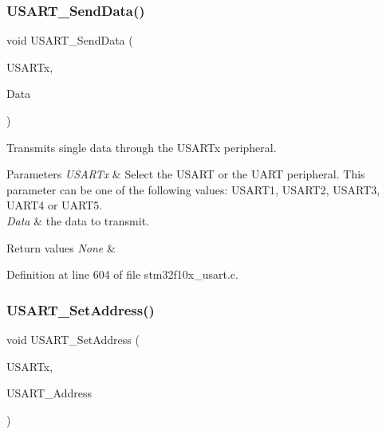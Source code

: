 \subsubsection{\texorpdfstring{U\+S\+A\+R\+T\+\_\+\+Send\+Data()}{USART\_SendData()}}
{\footnotesize\ttfamily void U\+S\+A\+R\+T\+\_\+\+Send\+Data (\begin{DoxyParamCaption}\item[{\hyperlink{struct_u_s_a_r_t___type_def}{U\+S\+A\+R\+T\+\_\+\+Type\+Def} $\ast$}]{U\+S\+A\+R\+Tx,  }\item[{uint16\+\_\+t}]{Data }\end{DoxyParamCaption})}



Transmits single data through the U\+S\+A\+R\+Tx peripheral. 


\begin{DoxyParams}{Parameters}
{\em U\+S\+A\+R\+Tx} & Select the U\+S\+A\+RT or the U\+A\+RT peripheral. This parameter can be one of the following values\+: U\+S\+A\+R\+T1, U\+S\+A\+R\+T2, U\+S\+A\+R\+T3, U\+A\+R\+T4 or U\+A\+R\+T5. \\
\hline
{\em Data} & the data to transmit. \\
\hline
\end{DoxyParams}

\begin{DoxyRetVals}{Return values}
{\em None} & \\
\hline
\end{DoxyRetVals}


Definition at line 604 of file stm32f10x\+\_\+usart.\+c.

\mbox{\label{group___u_s_a_r_t___private___functions_ga65ec9928817f3f031dd9a4dfc95d6666}} 
\subsubsection{\texorpdfstring{U\+S\+A\+R\+T\+\_\+\+Set\+Address()}{USART\_SetAddress()}}
{\footnotesize\ttfamily void U\+S\+A\+R\+T\+\_\+\+Set\+Address (\begin{DoxyParamCaption}\item[{\hyperlink{struct_u_s_a_r_t___type_def}{U\+S\+A\+R\+T\+\_\+\+Type\+Def} $\ast$}]{U\+S\+A\+R\+Tx,  }\item[{uint8\+\_\+t}]{U\+S\+A\+R\+T\+\_\+\+Address }\end{DoxyParamCaption})}



